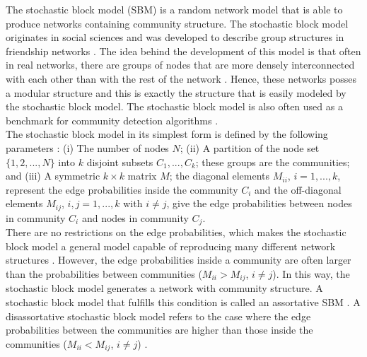 \documentclass[11 pt , letterpaper , twoside , openright]{book}
\begin{document}
The stochastic block model (SBM) is a random network model that is able to produce networks containing community structure. The stochastic block model originates in social sciences and was developed to describe group structures in friendship networks \cite{Funke2019}. The idea behind the development of this model is that often in real networks, there are groups of nodes that are more densely interconnected with each other than with the rest of the network \cite{F.Costa2007}. Hence, these networks posses a modular structure and this is exactly the structure that is easily modeled by the stochastic block model. The stochastic block model is also often used as a benchmark for community detection algorithms \cite{Abbe2018}.\\
\newline
The stochastic block model in its simplest form is defined by the following parameters \cite{Clauset2017}: (i) The number of nodes $N$; (ii) A partition of the node set $\{1, 2, ..., N\}$ into $k$ disjoint subsets $C_1, ..., C_k$; these groups are the communities; and (iii) A symmetric $k\times k$ matrix $M$; the diagonal elements $M_{ii}$, $i = 1, ..., k$, represent the edge probabilities inside the community $C_i$ and the off-diagonal elements $M_{ij}$, $i, j = 1, ..., k$ with $i \neq j$, give the edge probabilities between nodes in community $C_i$ and nodes in community $C_j$.\\
\newline
There are no restrictions on the edge probabilities, which makes the stochastic block model a general model capable of reproducing many different network structures \cite{Karrer2011}. However, the edge probabilities inside a community are often larger than the probabilities between communities ($M_{ii} > M_{ij}$, $i \neq j$). In this way, the stochastic block model generates a network with community structure. A stochastic block model that fulfills this condition is called an assortative SBM \cite{Lee2019}. A disassortative stochastic block model refers to the case where the edge probabilities between the communities are higher than those inside the communities ($M_{ii} < M_{ij}$, $i \neq j$) \cite{Gribel2020}.\\
\newline
\end{document}
